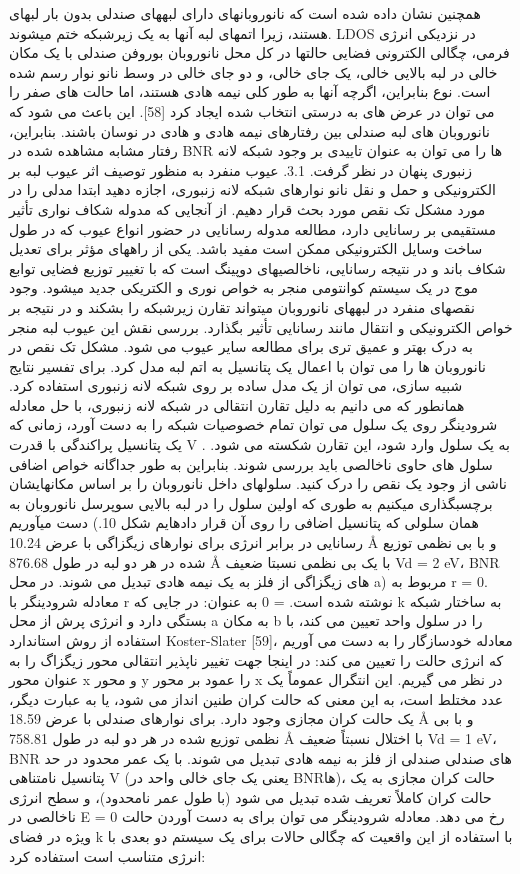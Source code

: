 همچنین نشان داده شده است که نانوروبانهای دارای لبههای صندلی بدون بار لبهای هستند، زیرا اتمهای لبه آنها به یک زیرشبکه ختم میشوند. LDOS در نزدیکی انرژی فرمی، چگالی الکترونی فضایی حالتها در کل محل نانوروبان بوروفن صندلی با یک مکان خالی در لبه بالایی خالی، یک جای خالی، و دو جای خالی در وسط نانو نوار رسم شده است. نوع بنابراین، اگرچه آنها به طور کلی نیمه هادی هستند، اما حالت های صفر را می توان در عرض های به درستی انتخاب شده ایجاد کرد [58]. این باعث می شود که نانوروبان های لبه صندلی بین رفتارهای نیمه هادی و هادی در نوسان باشند. بنابراین، رفتار مشابه مشاهده شده در BNR ها را می توان به عنوان تاییدی بر وجود شبکه لانه زنبوری پنهان در نظر گرفت. 3.1. عیوب منفرد به منظور توصیف اثر عیوب لبه بر الکترونیکی و حمل و نقل نانو نوارهای شبکه لانه زنبوری، اجازه دهید ابتدا مدلی را در مورد مشکل تک نقص مورد بحث قرار دهیم. از آنجایی که مدوله شکاف نواری تأثیر مستقیمی بر رسانایی دارد، مطالعه مدوله رسانایی در حضور انواع عیوب که در طول ساخت وسایل الکترونیکی ممکن است مفید باشد. یکی از راههای مؤثر برای تعدیل شکاف باند و در نتیجه رسانایی، ناخالصیهای دوپینگ است که با تغییر توزیع فضایی توابع موج در یک سیستم کوانتومی منجر به خواص نوری و الکتریکی جدید میشود. وجود نقصهای منفرد در لبههای نانوروبان میتواند تقارن زیرشبکه را بشکند و در نتیجه بر خواص الکترونیکی و انتقال مانند رسانایی تأثیر بگذارد. بررسی نقش این عیوب لبه منجر به درک بهتر و عمیق تری برای مطالعه سایر عیوب می شود. مشکل تک نقص در نانوروبان ها را می توان با اعمال یک پتانسیل به اتم لبه مدل کرد. برای تفسیر نتایج شبیه سازی، می توان از یک مدل ساده بر روی شبکه لانه زنبوری استفاده کرد. همانطور که می دانیم به دلیل تقارن انتقالی در شبکه لانه زنبوری، با حل معادله شرودینگر روی یک سلول می توان تمام خصوصیات شبکه را به دست آورد، زمانی که یک پتانسیل پراکندگی با قدرت V به یک سلول وارد شود، این تقارن شکسته می شود. . سلول های حاوی ناخالصی باید بررسی شوند. بنابراین به طور جداگانه خواص اضافی ناشی از وجود یک نقص را درک کنید. سلولهای داخل نانوروبان را بر اساس مکانهایشان برچسبگذاری میکنیم به طوری که اولین سلول را در لبه بالایی سوپرسل نانوروبان به دست میآوریم (همان سلولی که پتانسیل اضافی را روی آن قرار دادهایم شکل 10. رسانایی در برابر انرژی برای نوارهای زیگزاگی با عرض 10.24 Å و با بی نظمی توزیع شده در هر دو لبه در طول 876.68 Å با یک بی نظمی نسبتا ضعیف Vd = 2 eV، BNR های زیگزاگی از فلز به یک نیمه هادی تبدیل می شوند. در محل a) مربوط به r = 0. معادله شرودینگر با r نوشته شده است. = 0 به عنوان:
در جایی که k به ساختار شبکه بستگی دارد و انرژی پرش از محل a به مکان b را در سلول واحد تعیین می کند، با استفاده از روش استاندارد Koster-Slater [59]، معادله خودسازگار را به دست می آوریم که انرژی حالت را تعیین می کند:
در اینجا جهت تغییر ناپذیر انتقالی محور زیگزاگ را به عنوان محور x و محور y را عمود بر محور x در نظر می گیریم. این انتگرال عموماً یک عدد مختلط است، به این معنی که حالت کران طنین انداز می شود، یا به عبارت دیگر، یک حالت کران مجازی وجود دارد. برای نوارهای صندلی با عرض 18.59 Å و با بی نظمی توزیع شده در هر دو لبه در طول 758.81 Å با اختلال نسبتاً ضعیف Vd = 1 eV، BNR های صندلی صندلی از فلز به نیمه هادی تبدیل می شوند. با یک عمر محدود در حد پتانسیل نامتناهی V (یعنی یک جای خالی واحد در BNRها)، حالت کران مجازی به یک حالت کران کاملاً تعریف شده تبدیل می شود (با طول عمر نامحدود)، و سطح انرژی ناخالصی در E = 0 رخ می دهد. معادله شرودینگر می توان برای به دست آوردن حالت ویژه در فضای k با استفاده از این واقعیت که چگالی حالات برای یک سیستم دو بعدی با انرژی متناسب است استفاده کرد:
